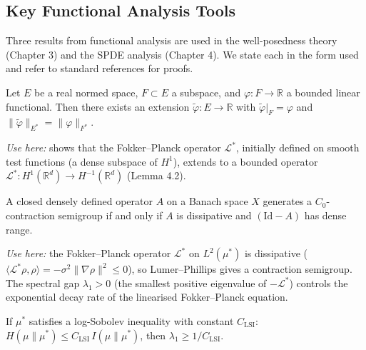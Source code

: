 \subsection{Key Functional Analysis Tools}
\label{sec:mp-functional-analysis}

Three results from functional analysis are used in the well-posedness theory
(Chapter 3) and the SPDE analysis (Chapter 4). We state each in the form used
and refer to standard references for proofs.

\begin{theorem}
\label{thm:hahn-banach}
Let $E$ be a real normed space, $F \subset E$ a subspace, and $\varphi : F \to
\mathbb{R}$ a bounded linear functional. Then there exists an extension
$\widetilde\varphi : E \to \mathbb{R}$ with $\widetilde\varphi|_F = \varphi$ and
$\|\widetilde\varphi\|_{E^*} = \|\varphi\|_{F^*}$.
\end{theorem}

\noindent\textit{Use here:} shows that the Fokker--Planck operator
$\mathcal{L}^*$, initially defined on smooth test functions (a dense subspace of
$H^1$), extends to a bounded operator
$\mathcal{L}^* : H^1(\mathbb{R}^d) \to H^{-1}(\mathbb{R}^d)$ (Lemma 4.2).

\begin{theorem}
\label{thm:lumer-phillips}
A closed densely defined operator $A$ on a Banach space $X$ generates a
$C_0$-contraction semigroup if and only if $A$ is dissipative and
$(\mathrm{Id} - A)$ has dense range.
\end{theorem}

\noindent\textit{Use here:} the Fokker--Planck operator $\mathcal{L}^*$ on
$L^2(\mu^*)$ is dissipative ($\langle \mathcal{L}^* \rho, \rho \rangle = -\sigma^2
\|\nabla\rho\|^2 \le 0$), so Lumer--Phillips gives a contraction semigroup. The
spectral gap $\lambda_1 > 0$ (the smallest positive eigenvalue of $-\mathcal{L}^*$)
controls the exponential decay rate of the linearised Fokker--Planck equation.

\begin{theorem}
\label{thm:log-sobolev}
If $\mu^*$ satisfies a log-Sobolev inequality with constant $C_{\mathrm{LSI}}$:
$H(\mu \| \mu^*) \le C_{\mathrm{LSI}}\, I(\mu \| \mu^*)$,
then $\lambda_1 \ge 1/C_{\mathrm{LSI}}$.
\end{theorem}

